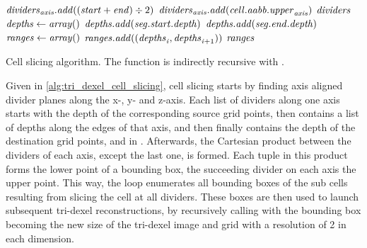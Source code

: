\begin{algorithm}
\begin{algorithmic}[1]
				\State $\mathit{dividers}_{\mathit{axis}}.\mathit{add}((\mathit{start} + \mathit{end}) \div 2)$
				\State $\mathit{dividers}_{\mathit{axis}}.\mathit{add}(\mathit{cell}.\mathit{aabb}.\mathit{upper}_{\mathit{axis}})$
			\EndFor
			\State \Return $\mathit{dividers}$
		\EndFunction
		\\
			\State $\mathit{depths} \gets \mathit{array}()$
					$\mathit{depths}.\mathit{add}(\mathit{seg}.\mathit{start}.\mathit{depth})$
				\EndIf
					$\mathit{depths}.\mathit{add}(\mathit{seg}.\mathit{end}.\mathit{depth})$
				\EndIf
			\EndFor
			\State $\mathit{ranges} \gets \mathit{array}()$
				\State $\mathit{ranges}.\mathit{add}((\mathit{depths}_{\mathit{i}}, \mathit{depths}_{\mathit{i} + 1}))$
			\EndFor
			\State \Return $\mathit{ranges}$
		\EndFunction
	\end{algorithmic}
	\caption{
		Cell slicing algorithm.
		The  function is indirectly recursive with .
	}
	\label{alg:tri_dexel_cell_slicing}
\end{algorithm}

Given in \cref{alg:tri_dexel_cell_slicing}, cell slicing starts by finding axis aligned divider planes along the x-, y- and z-axis.
Each list of dividers along one axis starts with the depth of the corresponding source grid points, then contains a list of depths along the edges of that axis, and then finally contains the depth of the destination grid points, \cf {} and  in .
Afterwards, the Cartesian product between the dividers of each axis, except the last one, is formed.
Each tuple in this product forms the lower point of a bounding box, the succeeding divider on each axis the upper point.
This way, the loop enumerates all bounding boxes of the sub cells resulting from slicing the cell at all dividers.
These boxes are then used to launch subsequent tri-dexel reconstructions, by recursively calling  with the bounding box becoming the new size of the tri-dexel image and grid with a resolution of 2 in each dimension.

